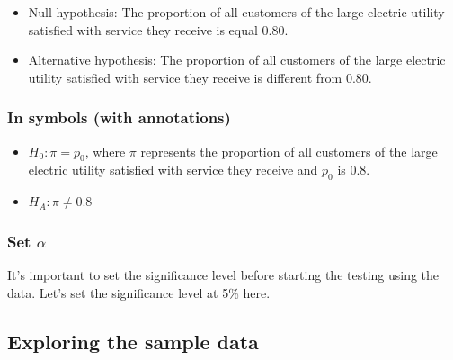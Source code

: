 \documentclass[12pt,]{krantz}
\makeatletter
\newenvironment{Shaded}{\begin{snugshade}}{\end{snugshade}}
\newcommand{\KeywordTok}[1]{\textcolor[rgb]{0.27,0.27,0.27}{\textbf{#1}}}
\newcommand{\DataTypeTok}[1]{\textcolor[rgb]{0.27,0.27,0.27}{#1}}
\newcommand{\DecValTok}[1]{\textcolor[rgb]{0.06,0.06,0.06}{#1}}
\newcommand{\StringTok}[1]{\textcolor[rgb]{0.5,0.5,0.5}{#1}}
\newcommand{\OperatorTok}[1]{\textcolor[rgb]{0.43,0.43,0.43}{\textbf{#1}}}
\newcommand{\NormalTok}[1]{#1}
\providecommand{\tightlist}{%
  \setlength{\itemsep}{0pt}\setlength{\parskip}{0pt}}
\newenvironment{kframe}{%
\medskip{}
\setlength{\fboxsep}{.8em}
 \def\at@end@of@kframe{}%
 \ifinner\ifhmode%
  \def\at@end@of@kframe{\end{minipage}}%
  \begin{minipage}{\columnwidth}%
 \fi\fi%
 \def\FrameCommand##1{\hskip\@totalleftmargin \hskip-\fboxsep
 \colorbox{shadecolor}{##1}\hskip-\fboxsep
     \hskip-\linewidth \hskip-\@totalleftmargin \hskip\columnwidth}%
 \MakeFramed {\advance\hsize-\width
   \@totalleftmargin\z@ \linewidth\hsize
   \@setminipage}}%
 {\par\unskip\endMakeFramed%
 \at@end@of@kframe}
\renewenvironment{Shaded}{\begin{kframe}}{\end{kframe}}
\theoremstyle{definition}
\theoremstyle{definition}
\theoremstyle{definition}
\theoremstyle{remark}
\makeatother
\begin{document}
\begin{itemize}
\item
  Null hypothesis: The proportion of all customers of the large electric
  utility satisfied with service they receive is equal 0.80.
\item
  Alternative hypothesis: The proportion of all customers of the large
  electric utility satisfied with service they receive is different from
  0.80.
\end{itemize}

\subsubsection*{In symbols (with
annotations)}\label{in-symbols-with-annotations-1}


\begin{itemize}
\tightlist
\item
  \(H_0: \pi = p_{0}\), where \(\pi\) represents the proportion of all
  customers of the large electric utility satisfied with service they
  receive and \(p_0\) is 0.8.
\item
  \(H_A: \pi \ne 0.8\)
\end{itemize}

\subsubsection*{\texorpdfstring{Set
\(\alpha\)}{Set \textbackslash{}alpha}}\label{set-alpha-1}


It's important to set the significance level before starting the testing
using the data. Let's set the significance level at 5\% here.

\subsection{Exploring the sample
data}\label{exploring-the-sample-data-1}

\begin{Shaded}
\end{Shaded}
\end{document}

